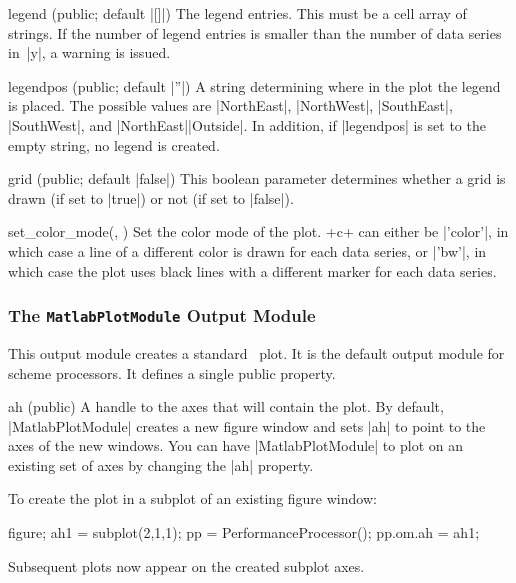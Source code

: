 \begin{property}{legend (public; default |[]|)}
  The legend entries. This must be a cell array of
  strings. If the number of legend entries is smaller than the number of data
  series in~|y|, a warning is issued.
\end{property}

\begin{property}{legendpos (public; default |''|)}
  A string determining where in the plot the legend is
  placed. The possible values are |NorthEast|, |NorthWest|, |SouthEast|,
  |SouthWest|, and |NorthEast|\-|Outside|. In addition, if |legendpos| is set to
  the empty string, no legend is created.
\end{property}

\begin{property}{grid (public; default |false|)}
  This boolean parameter determines whether a grid is drawn (if set to |true|)
  or not (if set to |false|).
\end{property}

\begin{method}{set_color_mode(\obj, )}
  Set the color mode of the plot. +c+ can either be |'color'|, in which case a
  line of a different color is drawn for each data series, or |'bw'|, in which
  case the plot uses black lines with a different marker for each data series.
\end{method}


\subsubsection{The \texttt{MatlabPlotModule} Output Module}

This output module creates a standard \matlab\ plot. It is the default output
module for scheme processors. It defines a single public property.
\begin{property}{ah (public)}
  A handle to the axes that will contain the plot. By default,
  |MatlabPlotModule| creates a new figure window and sets |ah| to point to the
  axes of the new windows. You can have |MatlabPlotModule| to plot on an
  existing set of axes by changing the |ah| property. 
    
  \codeexample To create the plot in a subplot of an existing figure window:
\begin{Code}
  figure;
  ah1 = subplot(2,1,1);
  pp = PerformanceProcessor();
  pp.om.ah = ah1;
\end{Code}
  Subsequent plots now appear on the created subplot axes.
\end{property}



